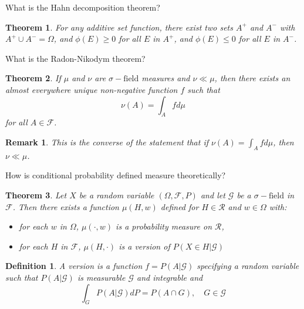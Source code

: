 \documentclass[avery5388,grid,frame]{flashcards}
\newcommand{\sigf}{\sigma-\text{field}}
\newcommand{\F}{\mathcal F}
\newtheorem*{theorem}{Theorem}
\newtheorem*{definition}{Definition}
\newtheorem*{remark}{Remark}
\begin{document}
\begin{flashcard}
    {What is the Hahn decomposition theorem?}
    \begin{theorem}
        For any additive set function, there exist two sets $A^+$ and $A^-$ with $A^+ \cup A^- = \Omega$, and $\phi(E) \geq 0$ for all $E$ in $A^+$, and $\phi(E) \leq 0$ for all $E$ in $A^-$.
    \end{theorem}
\end{flashcard}


\begin{flashcard}
    {What is the Radon-Nikodym theorem?}
    \begin{theorem}
        If $\mu$ and $\nu$ are $\sigf$ measures and $\nu \ll \mu$, then there exists an almost everywhere unique non-negative function $f$ such that
        $$\nu(A) = \int_A f d\mu$$
        for all $A \in \F$.
    \end{theorem}

    \begin{remark}
        This is the converse of the statement that if $\nu(A) = \int_A f d\mu$, then $\nu \ll \mu$.
    \end{remark}
\end{flashcard}


\begin{flashcard}
    {How is conditional probability defined measure theoretically?}
    \begin{theorem}
        Let $X$ be a random variable $(\Omega, \F, P)$ and let $\mathcal G$ be a $\sigf$ in $\F$. Then there exists a function $\mu(H,w)$ defined for $H \in \mathcal R$ and $w \in \Omega$ with:
        \begin{itemize}
            \item for each $w$ in $\Omega$, $\mu(\cdot,w)$ is a probability measure on $\mathcal R$,
            \item for each $H$ in $\F$, $\mu(H,\cdot)$ is a version of $P(X \in H | \mathcal G)$
        \end{itemize}
    \end{theorem}

    \begin{definition}
        A version is a function $f = P(A | \mathcal G)$ specifying a random variable such that $P(A | \mathcal G)$ is measurable $\mathcal G$ and integrable and
        $$\int_G P(A | \mathcal G) dP = P(A \cap G), \quad G \in \mathcal G$$
    \end{definition}
\end{flashcard}
\end{document}
